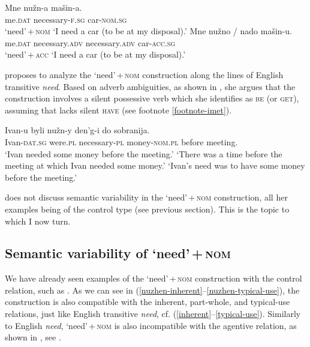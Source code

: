 \documentclass[output=paper]{langscibook}
\begin{document}
\ea
\ea \gll Mne nužn-a mašin-a.\\
     me.\textsc{dat} necessary-\textsc{f.sg} car-\textsc{nom.sg}\\ \hfill `need'\,+\,\textsc{nom}
\glt `I need a car (to be at my disposal).'\label{need-nom-rep}
\ex \gll Mne nužno / nado mašin-u.\\
     me.\textsc{dat} necessary.\textsc{adv} {} necessary.\textsc{adv} car-\textsc{acc.sg}\\ \hfill `need'\,+\,\textsc{acc}
\glt `I need a car (to be at my disposal).'\label{need-acc-rep}
\z \z

\noindent \citet{Harves2008} proposes to analyze the `need'\,+\,\textsc{nom} construction along the lines of English transitive \textit{need}. Based on adverb ambiguities, as shown in , she argues that the construction involves a silent possessive verb which she identifies as \textsc{be} (or \textsc{get}), assuming that  lacks silent \textsc{have} (see footnote \ref{footnote-imet}).

\ea \gll Ivan-u byli nužn-y den'g-i do sobranija.\\
Ivan-\textsc{dat.sg} were.\textsc{pl} necessary-\textsc{pl} money-\textsc{nom.pl} before  meeting.\\
\glt `Ivan needed some money before the meeting.'
\ea `There was a time before the meeting at which Ivan needed some money.'
\ex `Ivan's need was to have some money before the meeting.'\\
\hfill \citep[216]{Harves2008}
\label{nuzhen-harves}
\z\z

\noindent \citet{Harves2008} does not discuss semantic variability in the `need'\,+\,\textsc{nom} construction, all her examples being of the control type (see previous section). This is the topic to which I now turn.

\subsection{Semantic variability of `need'\,+\,\textsc{nom}}\label{section-nom-variability}

We have already seen examples of the `need'\,+\,\textsc{nom} construction with the control relation, such as . As we can see in (\ref{nuzhen-inherent}--\ref{nuzhen-typical-use}), the construction is also compatible with the inherent, part-whole, and typical-use relations, just like English transitive \textit{need}, cf. (\ref{inherent}--\ref{typical-use}). Similarly to English \textit{need}, `need'\,+\,\textsc{nom} is also incompatible with the agentive relation, as shown in , see .
\end{document}
